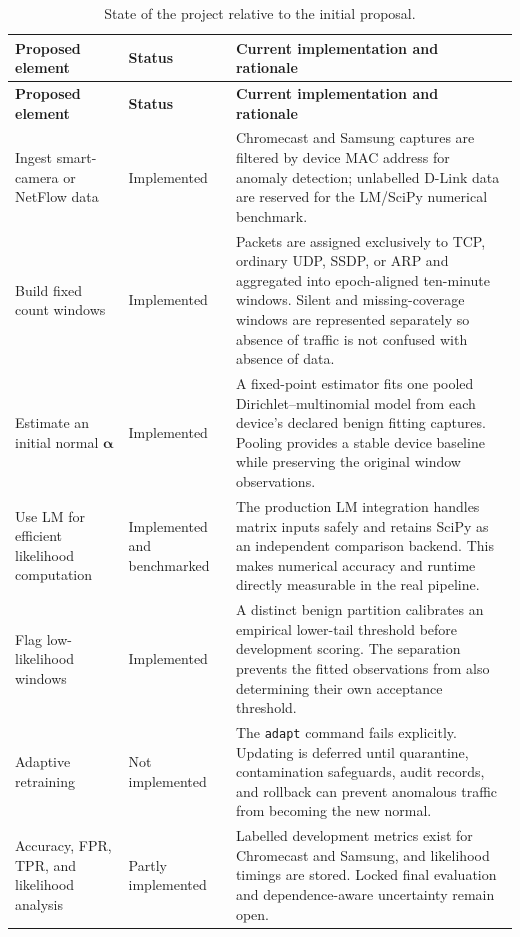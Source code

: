 \documentclass[11pt,a4paper]{article}
\begin{document}
\begin{longtable}{>{\raggedright\arraybackslash}p{} >{\raggedright\arraybackslash}p{} >{\raggedright\arraybackslash}p{}}
\caption{State of the project relative to the initial proposal.}\label{tab:projectstate}\\
\toprule
\textbf{Proposed element} & \textbf{Status} & \textbf{Current implementation and rationale} \\
\midrule
\endfirsthead
\toprule
\textbf{Proposed element} & \textbf{Status} & \textbf{Current implementation and rationale} \\
\midrule
\endhead
Ingest smart-camera or NetFlow data & Implemented & Chromecast and Samsung captures are filtered by device MAC address for anomaly detection; unlabelled D-Link data are reserved for the LM/SciPy numerical benchmark. \\
Build fixed count windows & Implemented & Packets are assigned exclusively to TCP, ordinary UDP, SSDP, or ARP and aggregated into epoch-aligned ten-minute windows. Silent and missing-coverage windows are represented separately so absence of traffic is not confused with absence of data. \\
Estimate an initial normal $\boldsymbol{\alpha}$ & Implemented & A fixed-point estimator fits one pooled Dirichlet--multinomial model from each device's declared benign fitting captures. Pooling provides a stable device baseline while preserving the original window observations. \\
Use LM for efficient likelihood computation & Implemented and benchmarked & The production LM integration handles matrix inputs safely and retains SciPy as an independent comparison backend. This makes numerical accuracy and runtime directly measurable in the real pipeline. \\
Flag low-likelihood windows & Implemented & A distinct benign partition calibrates an empirical lower-tail threshold before development scoring. The separation prevents the fitted observations from also determining their own acceptance threshold. \\
Adaptive retraining & Not implemented & The \texttt{adapt} command fails explicitly. Updating is deferred until quarantine, contamination safeguards, audit records, and rollback can prevent anomalous traffic from becoming the new normal. \\
Accuracy, FPR, TPR, and likelihood analysis & Partly implemented & Labelled development metrics exist for Chromecast and Samsung, and likelihood timings are stored. Locked final evaluation and dependence-aware uncertainty remain open. \\

\end{longtable}
\end{document}
